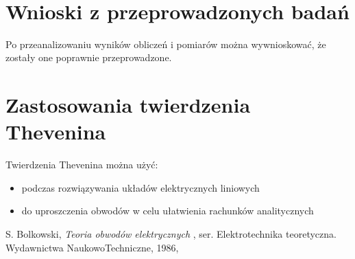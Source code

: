\documentclass[polish,polish,a4paper]{article}
\begin{document}
\begin{spacing}{2}
\begin{figure}[H]
\begin{equation*}
\begin{array}{|c|c|c|c|c|c|c|}
			\end{array}
			\end{equation*}
		\end{figure}
	\section{Wnioski z przeprowadzonych badań}
	Po przeanalizowaniu wyników obliczeń i pomiarów można wywnioskować, że zostały one poprawnie przeprowadzone. 
	\section{Zastosowania twierdzenia Thevenina}
	Twierdzenia Thevenina można użyć:
	\begin{itemize}
		\item podczas rozwiązywania układów elektrycznych liniowych 
		\item do uproszczenia obwodów w celu ułatwienia rachunków analitycznych
	\end{itemize}

	\begin{thebibliography}{99}
		  S. Bolkowski,  \emph{Teoria obwodów elektrycznych} , ser. Elektrotechnika teoretyczna. Wydawnictwa NaukowoTechniczne,
		1986, 
	\end{thebibliography}
	\newpage
	\tableofcontents
		
	\end{spacing}
\end{document}
